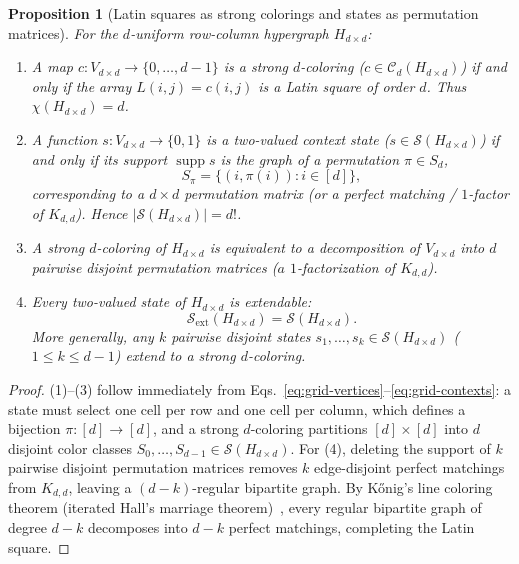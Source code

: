 \documentclass[aps,pra,reprint,superscriptaddress,longbibliography,nofootinbib,floatfix,10pt]{revtex4-2}
\newtheorem{proposition}[theorem]{Proposition}
\theoremstyle{definition}\newtheorem{definition}[theorem]{Definition}
\theoremstyle{remark}\newtheorem{remark}[theorem]{Remark}
\newcommand{\Sc}{\mathcal S}\newcommand{\Cc}{\mathcal C}
\DeclareMathOperator{\supp}{supp}\DeclareMathOperator{\conv}{conv}
\begin{document}
\begin{proposition}[Latin squares as strong colorings and states as permutation matrices]\label{prop:latin-bridge}
For the $d$-uniform row-column hypergraph $H_{d\times d}$:
\begin{enumerate}
\item A map $c:V_{d\times d}\to\{0,\ldots,d-1\}$ is a strong $d$-coloring ($c\in\Cc_d(H_{d\times d})$) if and only if the array $L(i,j)=c(i,j)$ is a Latin square of order $d$. Thus $\chi(H_{d\times d})=d$.
\item A function $s:V_{d\times d}\to\{0,1\}$ is a two-valued context state ($s\in\Sc(H_{d\times d})$) if and only if its support $\supp s$ is the graph of a permutation $\pi\in S_d$,
\begin{equation}\label{eq:perm-state}
S_\pi=\{(i,\pi(i)):i\in[d]\},
\end{equation}
corresponding to a $d\times d$ permutation matrix (or a perfect matching / $1$-factor of $K_{d,d}$). Hence $|\Sc(H_{d\times d})|=d!$.
\item A strong $d$-coloring of $H_{d\times d}$ is equivalent to a decomposition of $V_{d\times d}$ into $d$ pairwise disjoint permutation matrices ($a$ $1$-factorization of $K_{d,d}$).
\item Every two-valued state of $H_{d\times d}$ is extendable:
\begin{equation}\label{eq:latin-all-extend}
\Sc_{\mathrm{ext}}(H_{d\times d})=\Sc(H_{d\times d}).
\end{equation}
More generally, any $k$ pairwise disjoint states $s_1,\ldots,s_k\in\Sc(H_{d\times d})$ ($1\le k\le d-1$) extend to a strong $d$-coloring.
\end{enumerate}
\end{proposition}
\begin{proof}
(1)--(3) follow immediately from Eqs.~\eqref{eq:grid-vertices}--\eqref{eq:grid-contexts}: a state must select one cell per row and one cell per column, which defines a bijection $\pi:[d]\to[d]$, and a strong $d$-coloring partitions $[d]\times[d]$ into $d$ disjoint color classes $S_0,\ldots,S_{d-1}\in\Sc(H_{d\times d})$. For (4), deleting the support of $k$ pairwise disjoint permutation matrices removes $k$ edge-disjoint perfect matchings from $K_{d,d}$, leaving a $(d-k)$-regular bipartite graph. By K\H{o}nig's line coloring theorem (iterated Hall's marriage theorem)~\cite{hall-2015}, every regular bipartite graph of degree $d-k$ decomposes into $d-k$ perfect matchings, completing the Latin square.
\end{proof}
\end{document}
